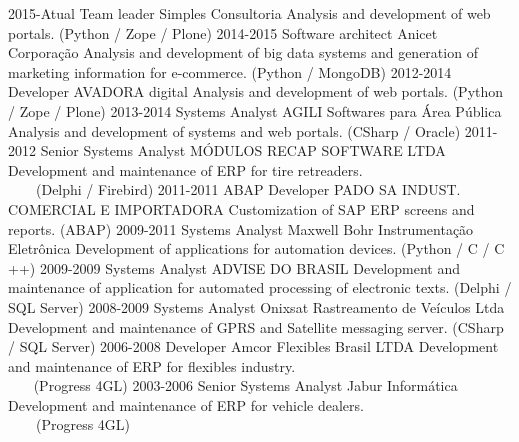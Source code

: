 \documentclass[]{twentysecondcv_en}
\begin{document}
\begin{twenty}
  \twentyitem
    {2015-Atual}
    {Team leader}
    {Simples Consultoria}
    {Analysis and development of web portals. (Python / Zope / Plone)}
  \twentyitem
    {2014-2015}
    {Software architect}
    {Anicet Corporação}
    {Analysis and development of big data systems and generation of marketing information for e-commerce. (Python / MongoDB)}
  \twentyitem
    {2012-2014}
    {Developer}
    {AVADORA digital}
    {Analysis and development of web portals. (Python / Zope / Plone)}
  \twentyitem
    {2013-2014}
    {Systems Analyst}
    {AGILI Softwares para Área Pública}
    {Analysis and development of systems and web portals. (CSharp / Oracle)}
  \twentyitem
    {2011-2012}
    {Senior Systems Analyst}
    {MÓDULOS RECAP SOFTWARE LTDA}
    {Development and maintenance of ERP for tire retreaders. \\
    (Delphi / Firebird)}
  \twentyitem
    {2011-2011}
    {ABAP Developer}
    {PADO SA INDUST. COMERCIAL E IMPORTADORA}
    {Customization of SAP ERP screens and reports. (ABAP)}
  \twentyitem
    {2009-2011}
    {Systems Analyst}
    {Maxwell Bohr Instrumentação Eletrônica}
    {Development of applications for automation devices. (Python / C / C ++)}
  \twentyitem
    {2009-2009}
    {Systems Analyst}
    {ADVISE DO BRASIL}
    {Development and maintenance of application for automated processing of electronic texts. (Delphi / SQL Server)}
  \twentyitem
    {2008-2009}
    {Systems Analyst}
    {Onixsat Rastreamento de Veículos Ltda}
    {Development and maintenance of GPRS and Satellite messaging server. (CSharp / SQL Server)}
  \twentyitem
    {2006-2008}
    {Developer}
    {Amcor Flexibles Brasil LTDA}
    {Development and maintenance of ERP for flexibles industry. \\
    (Progress 4GL)}
  \twentyitem
    {2003-2006}
    {Senior Systems Analyst}
    {Jabur Informática}
    {Development and maintenance of ERP for vehicle dealers. \\
    (Progress 4GL)}
\end{twenty}
\end{document}
